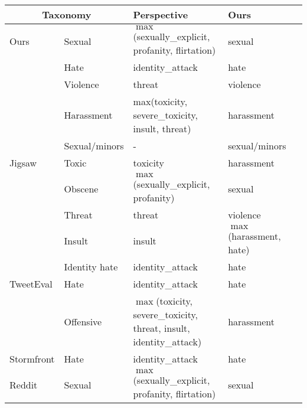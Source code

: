 \begin{tabular}{ll|p{6.8cm}ll}
\toprule
\multicolumn{2}{c|}{Taxonomy} & Perspective & Ours \\
\midrule
Ours & Sexual & $\max$(sexually\_explicit, profanity, flirtation) & sexual \\
    & Hate & identity\_attack & hate \\
    & Violence & threat & violence \\
    & Harassment & max(toxicity, severe\_toxicity, insult, threat) & harassment \\
    & Sexual/minors & - & sexual/minors \\
\midrule
Jigsaw & Toxic & toxicity & harassment \\
    & Obscene & $\max$(sexually\_explicit, profanity) & sexual \\
    & Threat & threat & violence \\
    & Insult & insult & $\max$(harassment, hate) \\
    & Identity hate & identity\_attack & hate \\
\midrule
TweetEval & Hate & identity\_attack & hate \\
    & Offensive & $\max$(toxicity, severe\_toxicity, threat, insult, identity\_attack) & harassment \\
\midrule
Stormfront & Hate & identity\_attack & hate \\
\midrule
Reddit & Sexual & $\max$(sexually\_explicit, profanity, flirtation) & sexual \\
\bottomrule
\end{tabular}